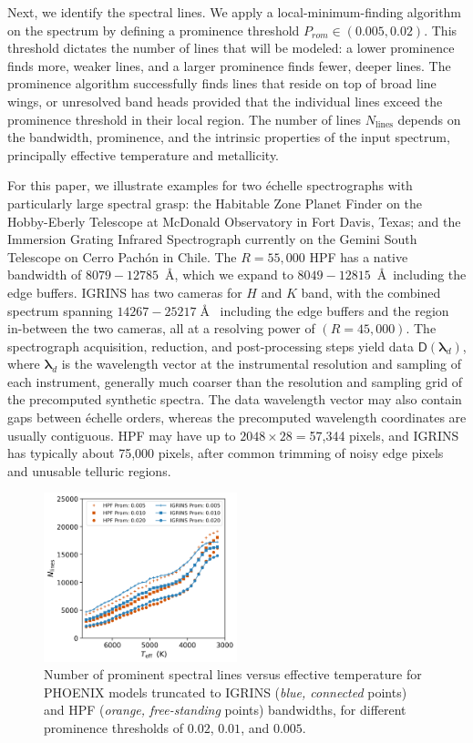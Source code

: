 \documentclass[modern]{aastex631}
\begin{document}
Next, we identify the spectral lines. We apply a local-minimum-finding algorithm on the spectrum by defining a prominence threshold $P_{rom} \in (0.005, 0.02)$. This threshold dictates the number of lines that will be modeled: a lower prominence finds more, weaker lines, and a larger prominence finds fewer, deeper lines. The prominence algorithm successfully finds lines that reside on top of broad line wings, or unresolved band heads provided that the individual lines exceed the prominence threshold in their local region. The number of lines $N_{\mathrm{lines}}$ depends on the bandwidth, prominence, and the intrinsic properties of the input spectrum, principally effective temperature and metallicity.

For this paper, we illustrate examples for two \'echelle spectrographs with particularly large spectral grasp: the Habitable Zone Planet Finder \citep[HPF,][]{2014SPIE.9147E..1GM} on the Hobby-Eberly Telescope at McDonald Observatory in Fort Davis, Texas; and the Immersion Grating Infrared Spectrograph \citep[IGRINS,][]{park14}
currently on the Gemini South Telescope on Cerro Pach\'on in Chile. The $R=55,000$ HPF has a native bandwidth of $8079-12785$~\AA, which we expand to $8049-12815$~\AA~including the edge buffers. IGRINS has two cameras for $H$ and $K$ band, with the combined spectrum spanning $14267-25217\;$\AA~ including the edge buffers and the region in-between the two cameras, all at a resolving power of $(R=45,000)$. The spectrograph acquisition, reduction, and post-processing steps yield data $\mathsf{D}(\bm{\lambda}_{d})$, where $\bm{\lambda}_{d}$ is the wavelength vector at the instrumental resolution and sampling of each instrument, generally much coarser than the resolution and sampling grid of the precomputed synthetic spectra. The data wavelength vector may also contain gaps between \'echelle orders, whereas the precomputed wavelength coordinates are usually contiguous. HPF may have up to $2048\times28=$57,344 pixels, and IGRINS has typically about 75,000 pixels, after common trimming of noisy edge pixels and unusable telluric regions.


\begin{figure}[hbt!]
    \centering
    \includegraphics[width=0.5\textwidth]{figures/N_lines_vs_Teff_prom.png}
    \caption{Number of prominent spectral lines versus effective temperature for PHOENIX models truncated to IGRINS (\emph{blue, connected} points) and HPF (\emph{orange, free-standing} points) bandwidths, for different prominence thresholds of $0.02$, $0.01$, and $0.005$.}
    \label{fig_Nlines_vs_teff}
\end{figure}
\end{document}
